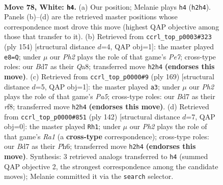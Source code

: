 \documentclass[11pt]{article}
\begin{document}
\clearpage

\begin{figure}[p]\centering
\begin{subfigure}{0.46\textwidth}\centering
\resizebox{\linewidth}{!}{%
\newchessgame
\chessboard[
  setfen={7R/3B1P2/8/8/1k6/8/5K1P/8 w - - 9 78},
  showmover=false,
  pgfstyle=straightmove, color=movearrow, markmove={h2-h4}
]}
\caption{}
\end{subfigure}\hfill
\begin{subfigure}{0.46\textwidth}\centering
\resizebox{\linewidth}{!}{%
\newchessgame
\chessboard[
  setfen={Q7/4P2R/8/5K2/8/3k4/8/8 w - - 1 78},
  showmover=false,
  pgfstyle=straightmove, color=movearrow, markmove={e7-e8}
]}
\caption{}
\end{subfigure}
\\[4pt]
\begin{subfigure}{0.46\textwidth}\centering
\resizebox{\linewidth}{!}{%
\newchessgame
\chessboard[
  setfen={5R2/1k6/8/8/p7/7P/r7/6K1 b - - 5 85},
  showmover=false,
  pgfstyle=straightmove, color=movearrow, markmove={a4-a3}
]}
\caption{}
\end{subfigure}\hfill
\begin{subfigure}{0.46\textwidth}\centering
\resizebox{\linewidth}{!}{%
\newchessgame
\chessboard[
  setfen={8/5k2/7P/2r5/8/5PK1/8/R7 w - - 3 72},
  showmover=false,
  pgfstyle=straightmove, color=movearrow, markmove={a1-h1}
]}
\caption{}
\end{subfigure}
\caption{\textbf{Move 78, White: \texttt{h4}.} (a) Our position; Melanie plays \texttt{h4} (\texttt{h2h4}). Panels (b)--(d) are the retrieved master positions whose correspondence most drove this move (highest QAP objective among those that transfer to it). (b) Retrieved from \texttt{ccrl\_top\_p0003\#323} (ply 154) [structural distance $d$=4, QAP obj=1]: the master played \texttt{e8=Q}; under $\mu$ our \emph{Ph2} plays the role of that game's \emph{Pe7}; cross-type roles: our \emph{B}d7 as their \emph{Q}a8; transferred move \texttt{h2h4} \textbf{(endorses this move)}. (c) Retrieved from \texttt{ccrl\_top\_p0000\#9} (ply 169) [structural distance $d$=5, QAP obj=1]: the master played \texttt{a3}; under $\mu$ our \emph{Ph2} plays the role of that game's \emph{Pa5}; cross-type roles: our \emph{B}d7 as their \emph{r}f8; transferred move \texttt{h2h4} \textbf{(endorses this move)}. (d) Retrieved from \texttt{ccrl\_top\_p0000\#851} (ply 142) [structural distance $d$=7, QAP obj=0]: the master played \texttt{Rh1}; under $\mu$ our \emph{Ph2} plays the role of that game's \emph{Ra1} (a \textbf{cross-type} correspondence); cross-type roles: our \emph{B}d7 as their \emph{P}h6; transferred move \texttt{h2h4} \textbf{(endorses this move)}. Synthesis: 3 retrieved analogs transferred to \texttt{h4} (summed QAP objective 2, the strongest correspondence among the candidate moves); Melanie committed it via the \texttt{search} selector.}
\label{fig:thought-m154}
\end{figure}
\end{document}
